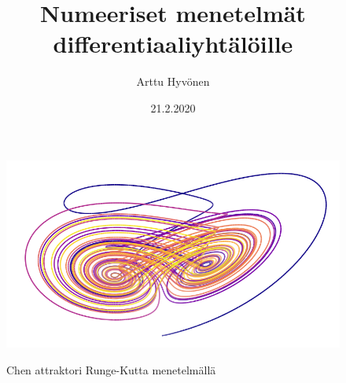 \documentclass[finnish, 11pt, fleqn]{beamer}
\title{Numeeriset menetelmät differentiaaliyhtälöille\vspace{-3ex}}
\author{Arttu Hyv\"onen\vspace{-4ex}}
\date{21.2.2020\vspace{-2ex}}
\begin{document}
\begin{frame}[plain]
	\addtocounter{framenumber}{-2}
	\vspace{2em}
	\maketitle
	\begin{figure}[h!]
		\centering
		\includegraphics[scale=0.4]{graphics/attractor1.png}
		\\ {\small \caption{Chen attraktori Runge-Kutta menetelmällä}}
	\end{figure}
\end{frame}
\end{document}
